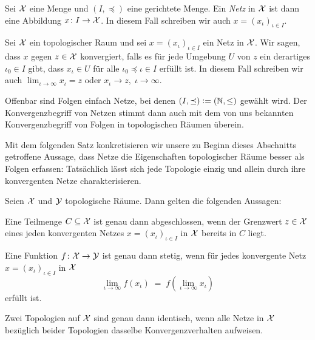 \documentclass[../thesis/thesis.tex]{subfiles}
\begin{document}
	\begin{Definition}[Netz]
		\label{def:netz}
		Sei $\mathcal{X}$ eine Menge und $(I, \preceq)$ eine gerichtete Menge. Ein \emph{Netz} in $\mathcal{X}$ ist dann eine Abbildung $x \colon I \to \mathcal{X}$. In diesem
		Fall schreiben wir auch $x = (x_\iota)_{\iota \in I}$.
	\end{Definition}
	
	\begin{Definition}
		Sei $\mathcal{X}$ ein topologischer Raum und sei $x = (x_\iota)_{\iota \in I}$ ein Netz in $\mathcal{X}$. Wir sagen, dass $x$ gegen $z \in \mathcal{X}$ konvergiert, falls
		es für jede Umgebung $U$ von $z$ ein derartiges $\iota_0 \in I$ gibt, dass $x_\iota \in U$ für alle $\iota_0 \preceq \iota \in I$ erfüllt ist.
		In diesem Fall schreiben wir auch $\lim_{\iota \to \infty} x_\iota = z$ oder $x_\iota \to z, \; \iota \to \infty$.
	\end{Definition}
	
	\begin{Bemerkung}
		Offenbar sind Folgen einfach Netze, bei denen $(I, \preceq) \vcentcolon = (\mathbb{N}, \leq)$ gewählt wird. Der Konvergenzbegriff von Netzen stimmt
		dann auch mit dem von uns bekannten Konvergenzbegriff von Folgen in topologischen Räumen überein.
	\end{Bemerkung}
	
	Mit dem folgenden Satz konkretisieren wir unsere zu Beginn dieses Abschnitts getroffene Aussage, dass Netze die Eigenschaften topologischer Räume
	besser als Folgen erfassen: Tatsächlich lässt sich jede Topologie einzig und allein durch ihre konvergenten Netze charakterisieren.
	
	\begin{Satz}
		\label{satz:netz_konvergenz}
		Seien $\mathcal{X}$ und $\mathcal{Y}$ topologische Räume. Dann gelten die folgenden Aussagen:
		\begin{enumeratethm}
			\item Eine Teilmenge $C \subseteq \mathcal{X}$ ist genau dann abgeschlossen, wenn der Grenzwert $z \in \mathcal{X}$ eines jeden konvergenten Netzes 
			$x = (x_\iota)_{\iota \in I}$ in $\mathcal{X}$ bereits in $C$ liegt.
			\item Eine Funktion $f \colon \mathcal{X} \to \mathcal{Y}$ ist genau dann stetig, wenn für jedes konvergente Netz $x = (x_\iota)_{\iota \in I}$ in $\mathcal{X}$ 
			\[ \lim_{\iota \to \infty} f(x_\iota) \; = \; f(\lim_{\iota \to \infty} x_\iota) \]
			erfüllt ist.
			\item Zwei Topologien auf $\mathcal{X}$ sind genau dann identisch, wenn alle Netze in $\mathcal{X}$ bezüglich beider Topologien dasselbe Konvergenzverhalten aufweisen.
		\end{enumeratethm}
	\end{Satz}
	
\end{document}
